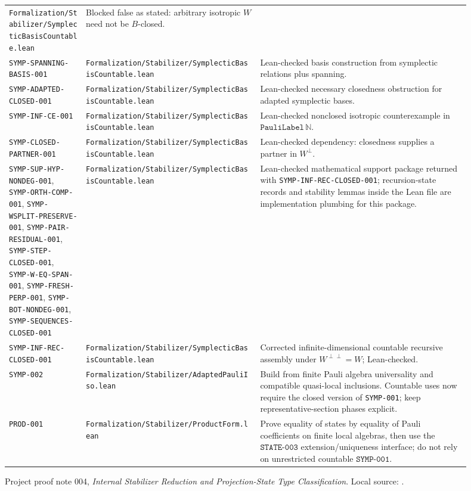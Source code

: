 \documentclass{article}
\begin{document}
\begin{longtable}{@{}p{0.15\linewidth}p{0.34\linewidth}p{0.41\linewidth}@{}}
\texttt{Formalization/Stabilizer/SymplecticBasisCountable.lean} &
Blocked false as stated: arbitrary isotropic \(W\) need not be
\(B\)-closed. \\
\texttt{SYMP-SPANNING-BASIS-001} &
\texttt{Formalization/Stabilizer/SymplecticBasisCountable.lean} &
Lean-checked basis construction from symplectic relations plus spanning. \\
\texttt{SYMP-ADAPTED-CLOSED-001} &
\texttt{Formalization/Stabilizer/SymplecticBasisCountable.lean} &
Lean-checked necessary closedness obstruction for adapted symplectic bases. \\
\texttt{SYMP-INF-CE-001} &
\texttt{Formalization/Stabilizer/SymplecticBasisCountable.lean} &
Lean-checked nonclosed isotropic counterexample in
\(\texttt{PauliLabel}\,\mathbb N\). \\
\texttt{SYMP-CLOSED-PARTNER-001} &
\texttt{Formalization/Stabilizer/SymplecticBasisCountable.lean} &
Lean-checked dependency: closedness supplies a partner in \(W^\perp\). \\
\texttt{SYMP-SUP-HYP-NONDEG-001},
\texttt{SYMP-ORTH-COMP-001},
\texttt{SYMP-WSPLIT-PRESERVE-001},
\texttt{SYMP-PAIR-RESIDUAL-001},
\texttt{SYMP-STEP-CLOSED-001},
\texttt{SYMP-W-EQ-SPAN-001},
\texttt{SYMP-FRESH-PERP-001},
\texttt{SYMP-BOT-NONDEG-001},
\texttt{SYMP-SEQUENCES-CLOSED-001} &
\texttt{Formalization/Stabilizer/SymplecticBasisCountable.lean} &
Lean-checked mathematical support package returned with
\texttt{SYMP-INF-REC-CLOSED-001}; recursion-state records and stability lemmas
inside the Lean file are implementation plumbing for this package. \\
\texttt{SYMP-INF-REC-CLOSED-001} &
\texttt{Formalization/Stabilizer/SymplecticBasisCountable.lean} &
Corrected infinite-dimensional countable recursive assembly under
\(W^{\perp\perp}=W\); Lean-checked. \\
\texttt{SYMP-002} &
\texttt{Formalization/Stabilizer/AdaptedPauliIso.lean} &
Build from finite Pauli algebra universality and compatible quasi-local
inclusions.  Countable uses now require the closed version of
\texttt{SYMP-001}; keep representative-section phases explicit. \\
\texttt{PROD-001} &
\texttt{Formalization/Stabilizer/ProductForm.lean} &
Prove equality of states by equality of Pauli coefficients on finite local
algebras, then use the \(\texttt{STATE-003}\) extension/uniqueness interface;
do not rely on unrestricted countable \(\texttt{SYMP-001}\). \\
\bottomrule
\end{longtable}

\begin{thebibliography}{9}
Project proof note 004,
\emph{Internal Stabilizer Reduction and Projection-State Type Classification}.
Local source:
.
\end{thebibliography}
\end{document}
